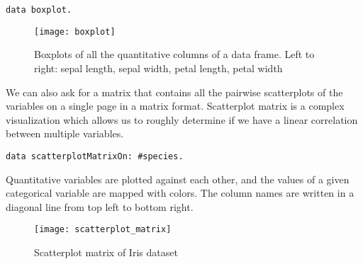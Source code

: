 \documentclass[sigplan]{acmart}
\begin{document}
\begin{lstlisting}[basicstyle=\small,language=Smalltalk]
data boxplot.
\end{lstlisting}
\begin{figure}[H]
  \begin{center}
  \texttt{[image: boxplot]}
  \caption{Boxplots of all the quantitative columns of a data frame. Left to right: sepal length, sepal width, petal length, petal width}
  \end{center}
\end{figure}

%
%

We can also ask for a matrix that contains all the pairwise scatterplots of the variables on a single page in a matrix format. Scatterplot matrix is a complex visualization which allows us to roughly determine if we have a linear correlation between multiple variables.

\begin{lstlisting}[basicstyle=\small,language=Smalltalk]
data scatterplotMatrixOn: #species.
\end{lstlisting}

Quantitative variables are plotted against each other, and the values of a given categorical variable are mapped with colors. The column names are written in a diagonal line from top left to bottom right.

\begin{figure}[H]
  \begin{center}
  \texttt{[image: scatterplot\_matrix]}
  \caption{Scatterplot matrix of Iris dataset}
  \end{center}
\end{figure}
\end{document}
